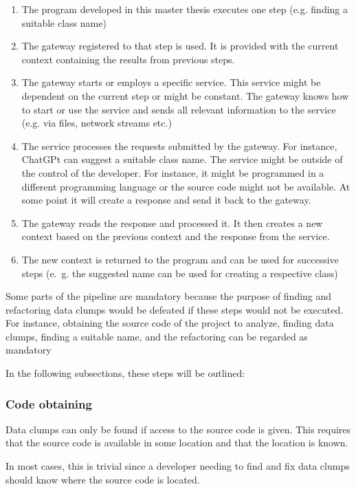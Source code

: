 \begin{enumerate}
    \item The program developed in this master thesis executes one step (e.g. finding a suitable class name)
    \item The gateway registered to that step is used. It is provided with the current context containing the results from previous steps.
    \item The gateway starts or employs a specific service. This service might be dependent on the current step or might be constant. The gateway knows how to start or use the service and sends all relevant information to the service (e.g. via files, network streams etc.) 
    \item The service processes the requests submitted by the gateway. For instance, ChatGPt can suggest a suitable class name. The service might be outside of the control of the developer. For instance, it might be programmed in a different programming language or the source code might not be available. At some point it will create a response and send it back to the gateway. 
    \item The gateway reads the response and processed it. It then creates a new context based on the previous context and the response from the service. 
    \item The new context is returned to the program and can be used for successive steps (e.~g. the suggested name can be used for creating a respective class) 
\end{enumerate}

Some parts of the pipeline are mandatory because the purpose of finding and refactoring data clumps would be defeated if these steps would not be executed. For instance, obtaining the source code of the project to analyze, finding data clumps, finding a suitable name, and the refactoring can be regarded as mandatory

In the following subsections, these steps will be outlined:
\subsubsection{Code obtaining}
Data clumps can only be found if access to the source code is given. This requires that the source code is available in some location and that the location is known.

In most cases, this is trivial since a developer needing to find and fix data clumps should know where the source code is located.

